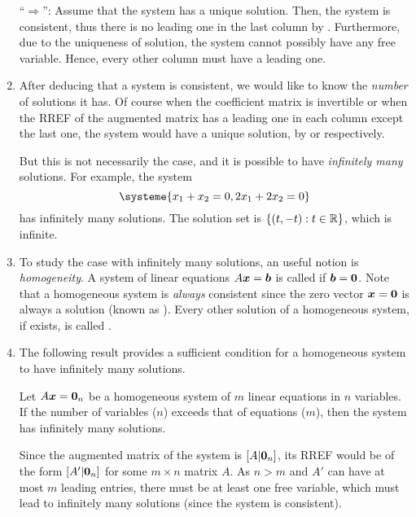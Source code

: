 \begin{enumerate}
\begin{pf}
``\(\Rightarrow\)'': Assume that the system has a unique solution. Then, the
system is consistent, thus there is no leading one in the last column by
. Furthermore, due to the uniqueness of solution,
the system cannot possibly have any free variable. Hence, every other column
must have a leading one.
\end{pf}

\item After deducing that a system is consistent, we would like to know the
\emph{number} of solutions it has. Of course when the coefficient matrix is
invertible or when the RREF of the augmented matrix has a leading one in each
column except the last one, the system would have a unique solution, by
 or  respectively.

But this is not necessarily the case, and it is possible to have
\emph{infinitely many} solutions. For example, the system
\[
\systeme{x_1+x_2=0,
2x_1+2x_2=0}
\]
has infinitely many solutions. The solution set is \(\{(t,-t):t\in\mathbb{R}\}\), which
is infinite.

\item To study the case with infinitely many solutions, an useful notion is
\emph{homogeneity}.  A system of linear equations \(A\vb*{x}=\vb*{b}\) is
called  if \(\vb*{b}=\vb*{0}\). Note that a homogeneous
system is \emph{always} consistent since the zero vector \(\vb*{x}=\vb*{0}\)
is always a solution (known as ). Every other solution
of a homogeneous system, if exists, is called .

\item The following result provides a sufficient condition for a homogeneous
system to have infinitely many solutions.

\begin{proposition}
\label{prp:homo-var-more-than-eqs-inf}
Let \(A\vb*{x}=\vb*{0}_n\) be a homogeneous system of \(m\) linear equations in
\(n\) variables. If the number of variables (\(n\)) exceeds that of equations
(\(m\)), then the system has infinitely many solutions.
\end{proposition}
\begin{pf}
Since the augmented matrix of the system is \([A|\vb*{0}_{n}]\), its RREF
would be of the form \([A'|\vb*{0}_{n}]\) for some \(m\times n\) matrix \(A\).
As \(n>m\) and \(A'\) can have at most \(m\) leading entries, there must be at
least one free variable, which must lead to infinitely many solutions (since
the system is consistent).
\end{pf}


\end{enumerate}
